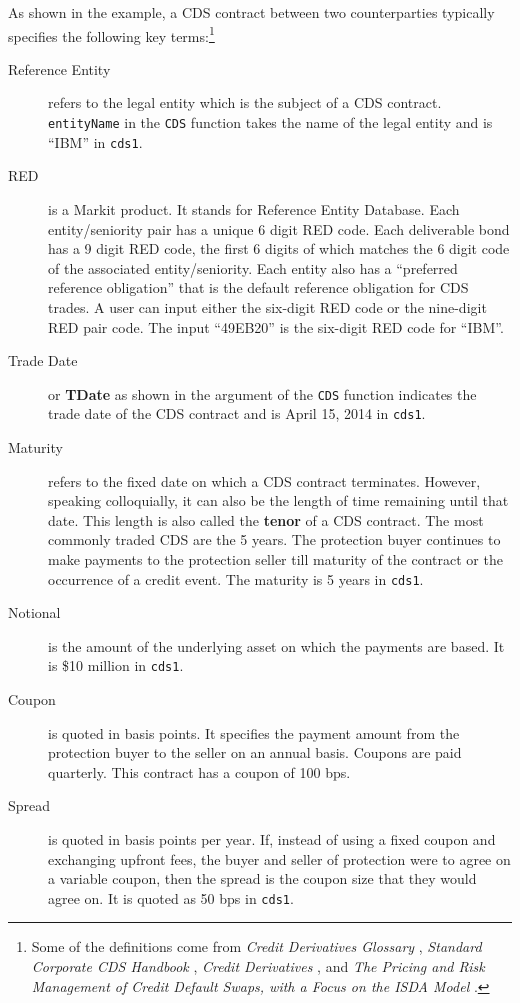 \documentclass[a4paper]{article}
\begin{document}
As shown in the example, a CDS contract between two counterparties
typically specifies the following key terms:\footnote{Some of the
  definitions come from \textit{Credit Derivatives Glossary}
  \citep{glossary}, \textit{Standard Corporate CDS Handbook}
  \citep{barclays}, \textit{Credit Derivatives} \citep{bloomberg}, and
  \textit{The Pricing and Risk Management of Credit Default Swaps,
    with a Focus on the ISDA Model} \citep{openGamma}.}
\begin{description}
\item[Reference Entity] refers to the legal entity which is the
  subject of a CDS contract. \texttt{entityName} in the \texttt{CDS}
  function takes the name of the legal entity and is ``IBM'' in
  \texttt{cds1}.
\item [RED] is a Markit product. It stands for Reference Entity
  Database. Each entity/seniority pair has a unique 6 digit RED
  code. Each deliverable bond has a 9 digit RED code, the first 6
  digits of which matches the 6 digit code of the associated
  entity/seniority. Each entity also has a ``preferred reference
  obligation'' that is the default reference obligation for CDS
  trades. A user can input either the six-digit RED code or the
  nine-digit RED pair code. The input ``49EB20'' is the six-digit RED
  code for ``IBM''.
\item [Trade Date] or \textbf{TDate} as shown in the argument of the
  \texttt{CDS} function indicates the trade date of the CDS contract
  and is April 15, 2014 in \texttt{cds1}.
\item[Maturity] refers to the fixed date on which a CDS contract
  terminates. However, speaking colloquially, it can also be the
  length of time remaining until that date. This length is also called
  the \textbf{tenor} of a CDS contract. The most commonly traded CDS
  are the 5 years. The protection buyer continues to make payments to
  the protection seller till maturity of the contract or the
  occurrence of a credit event. The maturity is 5 years in
  \texttt{cds1}.
\item[Notional] is the amount of the underlying asset on which the
  payments are based. It is \$10 million in \texttt{cds1}.
\item[Coupon] is quoted in basis points. It specifies the payment
  amount from the protection buyer to the seller on an annual
  basis. Coupons are paid quarterly. This contract has a coupon of 100
  bps.
\item[Spread] is quoted in basis points per year. If, instead of using
  a fixed coupon and exchanging upfront fees, the buyer and seller of
  protection were to agree on a variable coupon, then the spread is
  the coupon size that they would agree on. It is quoted as 50 bps in
  \texttt{cds1}.
\end{description}
\end{document}
